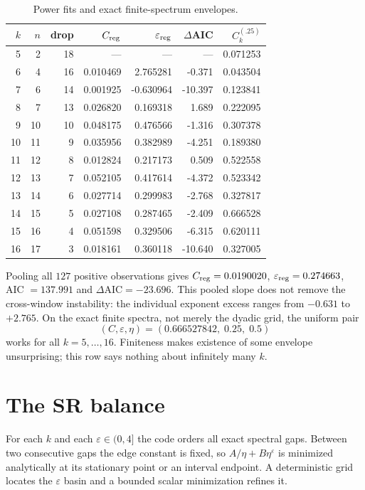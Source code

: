 \documentclass[11pt]{article}
\theoremstyle{remark}
\begin{document}
\begin{table}[ht]
\centering\small
\caption{Power fits and exact finite-spectrum envelopes.}
\label{tab:fits}
\begin{tabular}{@{}rrrrrrr@{}}
\toprule
$k$&$n$&drop&$C_{\rm reg}$&$\varepsilon_{\rm reg}$&
$\Delta$AIC&$C_k^{(.25)}$\\
\midrule
5&2&18&---&---&---&0.071253\\
6&4&16&0.010469& 2.765281& -0.371&0.043504\\
7&6&14&0.001925&-0.630964&-10.397&0.123841\\
8&7&13&0.026820& 0.169318&  1.689&0.222095\\
9&10&10&0.048175&0.476566& -1.316&0.307378\\
10&11&9&0.035956&0.382989& -4.251&0.189380\\
11&12&8&0.012824&0.217173&  0.509&0.522558\\
12&13&7&0.052105&0.417614& -4.372&0.523342\\
13&14&6&0.027714&0.299983& -2.768&0.327817\\
14&15&5&0.027108&0.287465& -2.409&0.666528\\
15&16&4&0.051598&0.329506& -6.315&0.620111\\
16&17&3&0.018161&0.360118&-10.640&0.327005\\
\bottomrule
\end{tabular}
\end{table}

Pooling all $127$ positive observations gives
$C_{\rm reg}=0.0190020$, $\varepsilon_{\rm reg}=0.274663$,
AIC $=137.991$ and $\Delta\mathrm{AIC}=-23.696$.  This pooled slope
does not remove the cross-window instability: the individual exponent
excess ranges from $-0.631$ to $+2.765$.  On the exact finite spectra,
not merely the dyadic grid, the uniform pair
\[
 (C,\varepsilon,\eta)=(0.666527842,\;0.25,\;0.5)
\]
works for all $k=5,\ldots,16$.  Finiteness makes existence of some
envelope unsurprising; this row says nothing about infinitely many $k$.

\section{The SR balance}

For each $k$ and each $\varepsilon\in(0,4]$ the code orders all exact
spectral gaps.  Between two consecutive gaps the edge constant is fixed,
so $A/\eta+B\eta^\varepsilon$ is minimized analytically at its stationary
point or an interval endpoint.  A deterministic grid locates the
$\varepsilon$ basin and a bounded scalar minimization refines it.
\end{document}
